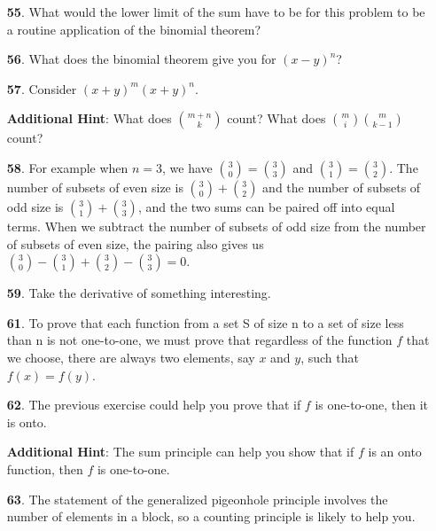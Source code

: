 \documentclass[10pt,]{book}
\theoremstyle{plain}
\theoremstyle{definition}
\theoremstyle{definition}
\numberwithin{equation}{chapter}
\begin{document}
\begin{itemize}[itemsep=1em]
\item[\textbf{55}.]\hypertarget{p-349}{}%
What would the lower limit of the sum have to be for this problem to be a routine application of the binomial theorem?%

\item[\textbf{56}.]\hypertarget{p-352}{}%
What does the binomial theorem give you for \((x - y)^n\)?%

\item[\textbf{57}.]\hypertarget{p-355}{}%
Consider \((x + y)^m (x + y)^n\).%

\par\smallskip
\noindent\textbf{Additional Hint}: \hypertarget{p-356}{}%
What does \(\binom{m+n}{k}\) count? What does \(\binom{m}{i}\binom{m}{k-1}\) count?%

\item[\textbf{58}.]\hypertarget{p-360}{}%
For example when \(n = 3\), we have \(\binom{3}{0} = \binom{3}{3}\) and \(\binom{3}{1} = \binom{3}{2}\).  The number of subsets of even size is \(\binom{3}{0}+\binom{3}{2}\) and the number of subsets of odd size is \(\binom{3}{1} + \binom{3}{3}\), and the two sums can be paired off into equal terms.  When we subtract the number of subsets of odd size from the number of subsets of even size, the pairing also gives us \(\binom{3}{0} - \binom{3}{1} + \binom{3}{2} - \binom{3}{3} =
0\).%

\item[\textbf{59}.]\hypertarget{p-363}{}%
Take the derivative of something interesting.%

\item[\textbf{61}.]\hypertarget{p-372}{}%
To prove that each function from a set S of size n to a set of size less than n is not one-to-one, we must prove that regardless of the function \(f\) that we choose, there are always two elements, say \(x\) and \(y\), such that \(f(x) = f(y)\).%

\item[\textbf{62}.]\hypertarget{p-375}{}%
The previous exercise could help you prove that if \(f\) is one-to-one, then it is onto.%

\par\smallskip
\noindent\textbf{Additional Hint}: \hypertarget{p-376}{}%
The sum principle can help you show that if \(f\) is an onto function, then \(f\) is one-to-one.%

\item[\textbf{63}.]\hypertarget{p-379}{}%
The statement of the generalized pigeonhole principle involves the number of elements in a block, so a counting principle is likely to help you.%


\end{itemize}
\end{document}

